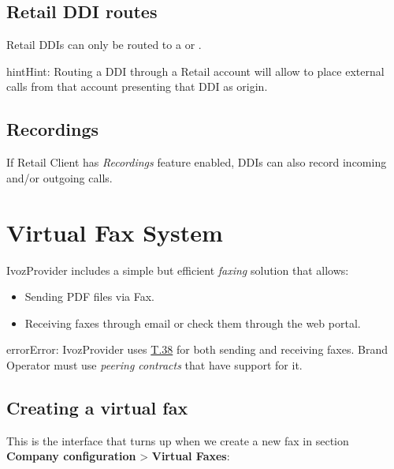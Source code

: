 \documentclass[letterpaper,10pt,english]{sphinxmanual}
\begin{document}
\subsection{Retail DDI routes}
\label{retail/retail_ddis:retail-ddi-routes}
Retail DDIs can only be routed to a {\hyperref[retail/retail_accounts:retail\string-accounts]{}}
or {\hyperref[faxing/index:faxing\string-system]{}}.

\begin{notice}{hint}{Hint:}
Routing a DDI through a Retail account will allow to place external calls
from that account presenting that DDI as origin.
\end{notice}


\subsection{Recordings}
\label{retail/retail_ddis:recordings}
If Retail Client has \emph{Recordings} feature enabled, DDIs can also record incoming and/or
outgoing calls.


\section{Virtual Fax System}
\label{faxing/index:virtual-fax-system}\label{faxing/index::doc}\label{faxing/index:faxing-system}
IvozProvider includes a simple but efficient \emph{faxing} solution that allows:
\begin{itemize}
\item {} 
Sending PDF files via Fax.

\item {} 
Receiving faxes through email or check them through the web portal.

\end{itemize}

\begin{notice}{error}{Error:}
IvozProvider uses
\href{http://www.voip-info.org/wiki/view/T.38}{T.38} for both sending and receiving
faxes. Brand Operator must use \emph{peering contracts} that have support for it.
\end{notice}


\subsection{Creating a virtual fax}
\label{faxing/index:creating-a-virtual-fax}
This is the interface that turns up when we create a new fax in section
\textbf{Company configuration} \textgreater{} \textbf{Virtual Faxes}:
\end{document}
